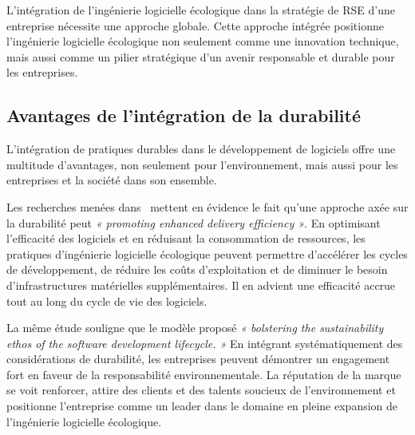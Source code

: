 L'intégration de l'ingénierie logicielle écologique dans la stratégie de RSE d'une entreprise nécessite une approche globale. Cette approche intégrée positionne l'ingénierie logicielle écologique non seulement comme une innovation technique, mais aussi comme un pilier stratégique d'un avenir responsable et durable pour les entreprises.


\subsection{Avantages de l’intégration de la durabilité}
L'intégration de pratiques durables dans le développement de logiciels offre une multitude d'avantages, non seulement pour l'environnement, mais aussi pour les entreprises et la société dans son ensemble.


Les recherches menées dans~\cite{IntegrationSustainabilityMetrics} mettent en évidence le fait qu'une approche axée sur la durabilité peut \emph{« promoting enhanced delivery efficiency »}. En optimisant l'efficacité des logiciels et en réduisant la consommation de ressources, les pratiques d'ingénierie logicielle écologique peuvent permettre d'accélérer les cycles de développement, de réduire les coûts d'exploitation et de diminuer le besoin d'infrastructures matérielles supplémentaires. Il en advient une efficacité accrue tout au long du cycle de vie des logiciels.


La même étude souligne que le modèle proposé \emph{« bolstering the sustainability ethos of the software development lifecycle. »} En intégrant systématiquement des considérations de durabilité, les entreprises peuvent démontrer un engagement fort en faveur de la responsabilité environnementale. La réputation de la marque se voit renforcer, attire des clients et des talents soucieux de l'environnement et positionne l'entreprise comme un leader dans le domaine en pleine expansion de l'ingénierie logicielle écologique.


